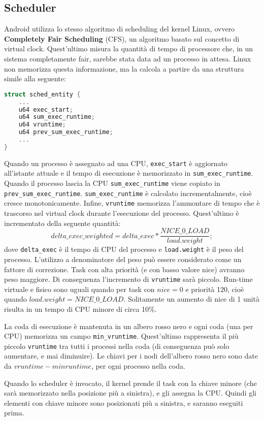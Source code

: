 \subsection{Scheduler}
Android utilizza lo stesso algoritmo di scheduling del kernel Linux, ovvero \textbf{Completely Fair Scheduling} (CFS), un algoritmo basato sul concetto di virtual clock. Quest'ultimo misura la quantità di tempo di processore che, in un sistema completamente fair, sarebbe stata data ad un processo in attesa. Linux non memorizza questa informazione, ma la calcola a partire da una struttura simile alla seguente:
\begin{lstlisting}[language=c, caption={Entità schedulabile in Linux}, label={lst:schedentity}]
struct sched_entity {
	...
	u64 exec_start;
	u64 sum_exec_runtime;
	u64 vruntime;
	u64 prev_sum_exec_runtime;
	...
}
\end{lstlisting}
Quando un processo è assegnato ad una CPU, \texttt{exec\_start} è aggiornato all'istante attuale e il tempo di esecuzione è memorizzato in \texttt{sum\_exec\_runtime}. Quando il processo lascia la CPU \texttt{sum\_exec\_runtime} viene copiato in \texttt{prev\_sum\_exec\_runtime}. \texttt{sum\_exec\_runtime} è calcolato incrementalmente, cioè cresce monotonicamente. Infine, \texttt{vruntime} memorizza l'ammontare di tempo che è trascorso nel virtual clock durante l'esecuzione del processo. Quest'ultimo è incrementato della seguente quantità:
\[ delta\_exec\_weighted = delta\_exec * \frac{NICE\_0\_LOAD}{load.weight}; \]
dove \texttt{delta\_exec} è il tempo di CPU del processo e \texttt{load.weight} è il peso del processo. L'utilizzo a denominatore del peso può essere considerato come un fattore di correzione. Task con alta priorità (e con basso valore nice) avranno peso maggiore. Di conseguenza l'incremento di \texttt{vruntime} sarà piccolo. Run-time virtuale e fisico sono uguali quando per task con $nice = 0$ e priorità 120, cioè quando $load.weight = NICE\_0\_LOAD$. Solitamente un aumento di nice di 1 unità risulta in un tempo di CPU minore di circa 10\%. 

La coda di esecuzione è mantenuta in un albero rosso nero e ogni coda (una per CPU) memorizza un campo \texttt{min\_vruntime}. Quest'ultimo rappresenta il più piccolo \texttt{vruntime} tra tutti i processi nella coda (di conseguenza può solo aumentare, e mai diminuire). Le chiavi per i nodi dell'albero rosso nero sono date da $vruntime - minruntime$, per ogni processo nella coda.

Quando lo scheduler è invocato, il kernel prende il task con la chiave minore (che sarà memorizzato nella posizione più a sinistra), e gli assegna la CPU. Quindi gli elementi con chiave minore sono posizionati più a sinistra, e saranno eseguiti prima.

